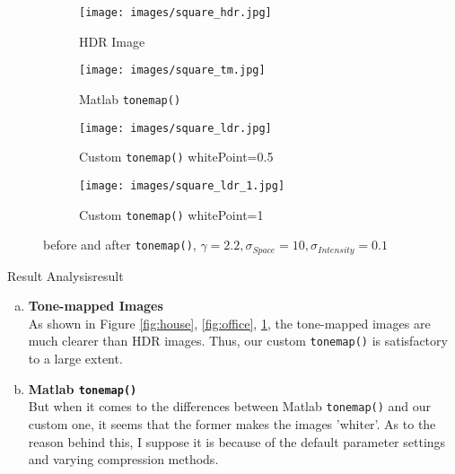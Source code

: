 \begin{figure}[htbp]
    \centering 
    \begin{minipage}{0.8\textwidth} 
        \centering 
        
        \begin{subfigure}[b]{0.45\linewidth} 
            \texttt{[image: images/square\_hdr.jpg]}
            \caption{HDR Image}
        \end{subfigure}
        \hfill
        \begin{subfigure}[b]{0.45\linewidth}
            \texttt{[image: images/square\_tm.jpg]}
            \caption{Matlab \texttt{tonemap()}}
        \end{subfigure}

        \vspace{0.5cm}
        \begin{subfigure}[b]{0.45\linewidth}
            \texttt{[image: images/square\_ldr.jpg]}
            \caption{Custom \texttt{tonemap()} whitePoint=0.5}
        \end{subfigure}
        \hfill
        \begin{subfigure}[b]{0.45\linewidth}
            \texttt{[image: images/square\_ldr\_1.jpg]}
            \caption{Custom \texttt{tonemap()} whitePoint=1}
        \end{subfigure}

        \caption{before and after \texttt{tonemap()}, $\gamma=2.2, \sigma_{Space}=10, \sigma_{Intensity}=0.1$}
        \label{fig:square}
    \end{minipage}
\end{figure}



\begin{problem}{Result Analysis}{result}

\begin{enumerate}[(a)]
    \item \textbf{Tone-mapped Images}\\ As shown in Figure \ref{fig:house}, \ref{fig:office}, \ref{fig:square}, the tone-mapped images are much clearer than HDR images. Thus, our custom \texttt{tonemap()} is satisfactory to a large extent.  

    \item \textbf{Matlab \texttt{tonemap()}}\\But when it comes to the differences between Matlab \texttt{tonemap()} and our custom one, it seems that the former makes the images 'whiter'. As to the reason behind this, I suppose it is because of the default parameter settings and varying compression methods.
\end{enumerate}
\end{problem}

